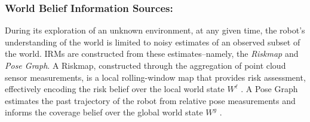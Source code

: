 \documentclass[letterpaper]{article} %
\newcommand{\ph}[1]{{\textbf{#1}:}} %
\begin{document}


\subsubsection{World Belief Information Sources:} \hfill
\vspace{-0.25pt}

\noindent
During its exploration of an unknown environment, at any given time, the robot's understanding of the world is limited to noisy estimates of an observed subset of the world. 
IRMs are constructed from these estimates--namely, the \textit{Riskmap} and \textit{Pose Graph}.
A Riskmap, constructed through the aggregation of point cloud sensor measurements, is a local rolling-window map that provides risk assessment, 
effectively encoding the risk belief over the local world state $W^\ell$ \cite{fan2021step}.
A Pose Graph
estimates the past trajectory of the robot from relative pose measurements and informs the coverage belief over the global world state $W^g$ \cite{Ebadi2020}. 
\end{document}
